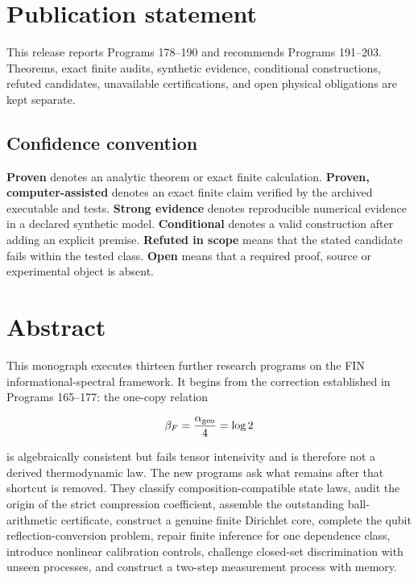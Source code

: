 \documentclass[11pt,a4paper,openany]{report}
\begin{document}
\chapter*{Publication statement}
This release reports Programs 178--190 and recommends Programs 191--203.
Theorems, exact finite audits, synthetic evidence, conditional constructions,
refuted candidates, unavailable certifications, and open physical obligations
are kept separate.

\tableofcontents
\clearpage
{}

\section{Confidence convention}

\textbf{Proven} denotes an analytic theorem or exact finite calculation. \textbf{Proven, computer-assisted} denotes an exact finite claim verified by the archived executable and tests. \textbf{Strong evidence} denotes reproducible numerical evidence in a declared synthetic model. \textbf{Conditional} denotes a valid construction after adding an explicit premise. \textbf{Refuted in scope} means that the stated candidate fails within the tested class. \textbf{Open} means that a required proof, source or experimental object is absent.

\chapter{Abstract}

This monograph executes thirteen further research programs on the FIN informational-spectral framework. It begins from the correction established in Programs 165--177: the one-copy relation

\[
\beta_F=\frac{\alpha_{\rm geo}}4=\log2
\]

is algebraically consistent but fails tensor intensivity and is therefore not a derived thermodynamic law. The new programs ask what remains after that shortcut is removed. They classify composition-compatible state laws, audit the origin of the strict compression coefficient, assemble the outstanding ball-arithmetic certificate, construct a genuine finite Dirichlet core, complete the qubit reflection-conversion problem, repair finite inference for one dependence class, introduce nonlinear calibration controls, challenge closed-set discrimination with unseen processes, and construct a two-step measurement process with memory.
\end{document}
